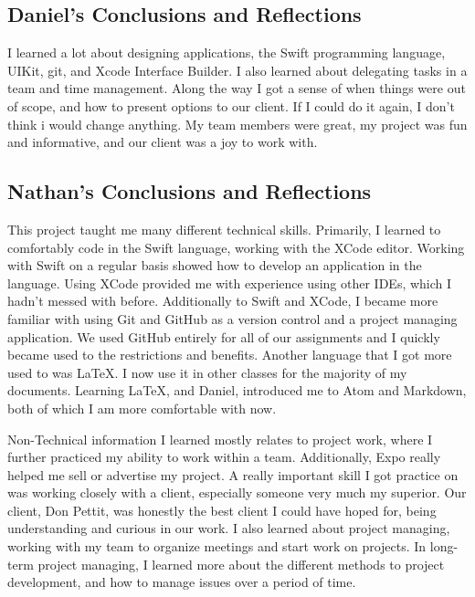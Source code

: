 \documentclass[onecolumn, draftclsnofoot,10pt, compsoc]{IEEEtran}
\begin{document}
\subsection{Daniel's Conclusions and Reflections}
    I learned a lot about designing applications, the Swift programming language, UIKit, git, and Xcode Interface Builder.
    I also learned about delegating tasks in a team and time management.
    Along the way I got a sense of when things were out of scope, and how to present options to our client.
    If I could do it again, I don't think i would change anything.
    My team members were great, my project was fun and informative, and our client was a joy to work with.


\subsection{Nathan's Conclusions and Reflections}
This project taught me many different technical skills.
Primarily, I learned to comfortably code in the Swift language, working with the XCode editor.
Working with Swift on a regular basis showed how to develop an application in the language.
Using XCode provided me with experience using other IDEs, which I hadn't messed with before.
Additionally to Swift and XCode, I became more familiar with using Git and GitHub as a version control and a project managing application.
We used GitHub entirely for all of our assignments and I quickly became used to the restrictions and benefits.
Another language that I got more used to was \LaTeX.
I now use it in other classes for the majority of my documents.
Learning \LaTeX, and Daniel, introduced me to Atom and Markdown, both of which I am more comfortable with now.

Non-Technical information I learned mostly relates to project work, where I further practiced my ability to work within a team.
Additionally, Expo really helped me sell or advertise my project.
A really important skill I got practice on was working closely with a client, especially someone very much my superior.
Our client, Don Pettit, was honestly the best client I could have hoped for, being understanding and curious in our work.
I also learned about project managing, working with my team to organize meetings and start work on projects.
In long-term project managing, I learned more about the different methods to project development, and how to manage issues over a period of time.
\end{document}
